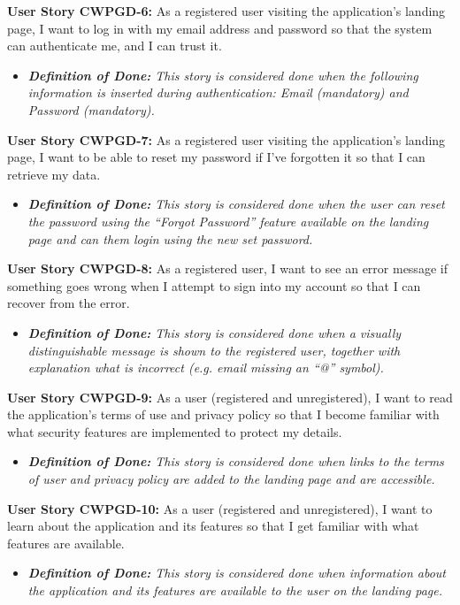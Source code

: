 \noindent \textbf{User Story CWPGD-6:} As a registered user visiting the application’s landing page, I want to log in with my email address and password so that the system can authenticate me, and I can trust it. 
\begin{itemize}
	\item \textit{\textbf{Definition of Done:} This story is considered done when the following information is inserted during authentication: Email (mandatory) and Password (mandatory).} 
\end{itemize}

\noindent \textbf{User Story CWPGD-7:} As a registered user visiting the application’s landing page, I want to be able to reset my password if I’ve forgotten it so that I can retrieve my data.
\begin{itemize}
	\item \textit{\textbf{Definition of Done:} This story is considered done when the user can reset the password using the “Forgot Password” feature available on the landing page and can them login using the new set password.} 
\end{itemize}

\noindent \textbf{User Story CWPGD-8:} As a registered user, I want to see an error message if something goes wrong when I attempt to sign into my account so that I can recover from the error.
\begin{itemize}
	\item \textit{\textbf{Definition of Done:} This story is considered done when a visually distinguishable message is shown to the registered user, together with explanation what is incorrect (e.g. email missing an “@” symbol).} 
\end{itemize}

\noindent \textbf{User Story CWPGD-9:} As a user (registered and unregistered), I want to read the application’s terms of use and privacy policy so that I become familiar with what security features are implemented to protect my details.
\begin{itemize}
	\item \textit{\textbf{Definition of Done:} This story is considered done when links to the terms of user and privacy policy are added to the landing page and are accessible.} 
\end{itemize}

\noindent \textbf{User Story CWPGD-10:} As a user (registered and unregistered), I want to learn about the application and its features so that I get familiar with what features are available.
\begin{itemize}
	\item \textit{\textbf{Definition of Done:} This story is considered done when information about the application and its features are available to the user on the landing page.} 
\end{itemize}


